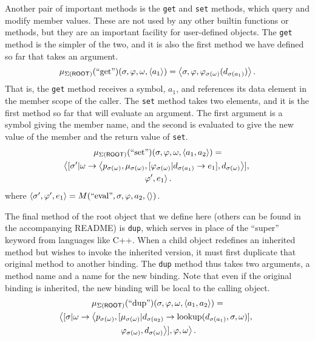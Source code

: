 \documentclass[twocolumn]{article}
\begin{document}
Another pair of important methods is the \texttt{get} and \texttt{set}
methods, which query and modify member values. These are not used by
any other builtin functions or methods, but they are an important
facility for user-defined objects. The \texttt{get} method is the
simpler of the two, and it is also the first method we have defined so
far that takes an argument.
\[ \mu_{\Sigma(\mathsf{ROOT})}(\text{``get''})(\sigma,\varphi,\omega,
\left< a_1\right>) = \left< \sigma, \varphi,
\varphi_{\sigma(\omega)}(d_{\sigma(a_1)})\right>.\] That is, the
\texttt{get} method receives a symbol, $a_1$, and references its data
element in the member scope of the caller. The \texttt{set} method
takes two elements, and it is the first method so far that will
evaluate an argument. The first argument is a symbol giving the member
name, and the second is evaluated to give the new value of the member
and the return value of \texttt{set}.
\begin{multline*}
  \mu_{\Sigma(\mathsf{ROOT})}(\text{``set''})(\sigma,\varphi,\omega,
  \left< a_1,a_2\right>) =\\ \left< [\sigma'|\omega\rightarrow \left< p_{\sigma(\omega)},
  \mu_{\sigma(\omega)},[\varphi_{\sigma(\omega)}|d_{\sigma(a_1)}\rightarrow e_1],
  d_{\sigma(\omega)}\right>],\right.\\\left.\varphi', e_1\right>.
\end{multline*}
where $\left< \sigma',\varphi',e_1 \right> = M(\text{``eval''},\sigma,
\varphi, a_2, \left<\right>)$.

The final method of the root object that we define here (others can be
found in the accompanying README) is \texttt{dup}, which serves in
place of the ``super'' keyword from languages like C++. When a child
object redefines an inherited method but wishes to invoke the
inherited version, it must first duplicate that original method to
another binding. The \texttt{dup} method thus takes two arguments, a
method name and a name for the new binding. Note that even if the
original binding is inherited, the new binding will be local to the
calling object.
\begin{multline*}
  \mu_{\Sigma(\mathsf{ROOT})}(\text{``dup''})(\sigma,\varphi,\omega,
  \left< a_1,a_2\right>) =\\ \left< [\sigma|\omega\rightarrow \left<
  p_{\sigma(\omega)}, [\mu_{\sigma(\omega)}|d_{\sigma(a_2)}\rightarrow
  \operatorname{lookup}(d_{\sigma(a_1)},\sigma,\omega)],\right.\right.\\\left.\left.
  \varphi_{\sigma(\omega)},
  d_{\sigma(\omega)}\right>],\varphi, \omega\right>.
\end{multline*}
\end{document}
